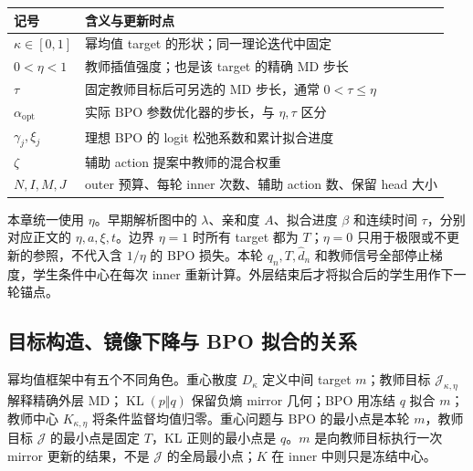 \documentclass[lang=cn,scheme=chinese,openany]{../book/elegantbook}
\newcommand{\KL}{\operatorname{KL}}
\begin{document}
\begin{center}
\begin{tabular}{lp{108mm}}
\toprule
记号 & 含义与更新时点\\
\midrule
$\kappa\in[0,1]$ & 幂均值 target 的形状；同一理论迭代中固定\\
$0<\eta<1$ & 教师插值强度；也是该 target 的精确 MD 步长\\
$\tau$ & 固定教师目标后可另选的 MD 步长，通常 $0<\tau\le\eta$\\
$\alpha_{\mathrm{opt}}$ & 实际 BPO 参数优化器的步长，与 $\eta,\tau$ 区分\\
$\gamma_j,\xi_j$ & 理想 BPO 的 logit 松弛系数和累计拟合进度\\
$\zeta$ & 辅助 action 提案中教师的混合权重\\
$N,I,M,J$ & outer 预算、每轮 inner 次数、辅助 action 数、保留 head 大小\\
\bottomrule
\end{tabular}
\end{center}

本章统一使用 $\eta$。早期解析图中的 $\lambda$、亲和度 $A$、拟合进度 $\beta$ 和连续时间 $\tau$，分别对应正文的 $\eta,a,\xi,t$。边界 $\eta=1$ 时所有 target 都为 $T$；$\eta=0$ 只用于极限或不更新的参照，不代入含 $1/\eta$ 的 BPO 损失。本轮 $q_n,T,\widehat d_n$ 和教师信号全部停止梯度，学生条件中心在每次 inner 重新计算。外层结束后才将拟合后的学生用作下一轮锚点。

\subsection{目标构造、镜像下降与 BPO 拟合的关系}

幂均值框架中有五个不同角色。重心散度 $D_\kappa$ 定义中间 target $m$；教师目标 $\mathcal J_{\kappa,\eta}$ 解释精确外层 MD；$\KL(p\Vert q)$ 保留负熵 mirror 几何；BPO 用冻结 $q$ 拟合 $m$；教师中心 $K_{\kappa,\eta}$ 将条件监督均值归零。重心问题与 BPO 的最小点是本轮 $m$，教师目标 $\mathcal J$ 的最小点是固定 $T$，KL 正则的最小点是 $q$。$m$ 是向教师目标执行一次 mirror 更新的结果，不是 $\mathcal J$ 的全局最小点；$K$ 在 inner 中则只是冻结中心。
\end{document}
